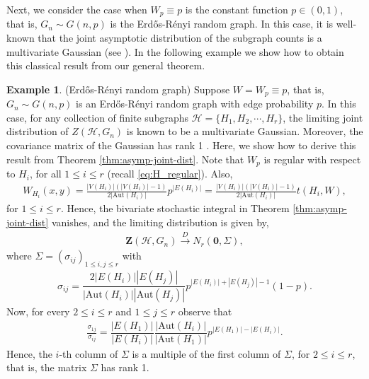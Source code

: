 \documentclass[11pt,reqno]{amsart}
\numberwithin{equation}{section}
\newcommand{\cH}{{\mathcal H}}
\newcommand\Aut{\mathrm{Aut}}
\newcommand\dto{\overset{D}{\rightarrow}}
\theoremstyle{definition}
\newtheorem{example}{Example}[section]
\begin{document}
Next, we consider the case when $W_p \equiv p$ is the constant function $p \in (0, 1)$, that is, $G_n \sim G(n, p)$ is the Erd\H{o}s-R\'enyi random graph. In this case, it is well-known that the joint asymptotic distribution of the subgraph counts is a multivariate Gaussian (see \cite[Section 9]{janson1991asymptotic}). In the following example we show how to obtain this classical result from our general theorem. 



\begin{example}\label{example:randomgraph}(Erd\H{o}s-R\'enyi random graph) 
Suppose $W = W_p \equiv p$, that is, $G_n \sim G(n, p)$ is an Erd\H{o}s-R\'enyi random graph with edge probability $p$. In this case, for any  collection of finite subgraphs $\mathcal{H} = \{H_{1},H_{2}, \cdots, H_{r}\}$, the limiting joint distribution of $Z(\cH, G_n)$ is known to be a multivariate Gaussian. Moreover, the covariance matrix of the Gaussian has rank 1 \cite[Section 9]{janson1991asymptotic}. Here, we show how to derive this result from Theorem \ref{thm:asymp-joint-dist}. Note that $W_p$ is regular with respect to $H_i$, for all $1\leq i\leq r$ (recall \eqref{eq:H_regular}). Also, 
\begin{align*}
    W_{H_{i}}(x,y) = \frac{|V(H_{i})|(|V(H_{i})| - 1)}{2|\Aut{(H_{i})}|}p^{|E(H_{i})|} =\frac{|V(H_{i})|(|V(H_{i})| - 1)}{2|\Aut{(H_{i})}|} t(H_{i},W) , 
\end{align*}
for $1\leq i\leq r$. Hence, the bivariate stochastic integral in Theorem \ref{thm:asymp-joint-dist} vanishes, and the limiting distribution is given by,
\begin{align}\label{eq:ErdosRenyidistconvg}
    \bm{Z}(\mathcal{H}, G_n) \dto N_r(\bm 0, \Sigma) , 
\end{align}
where $\Sigma = (\sigma_{ij})_{1\leq i,j\leq r}$ with 
\begin{align}\label{eq:ErdosRenyicovmat}
    \sigma_{ij} = \dfrac{2 |E(H_{i})||E(H_{j})|}{|\Aut{(H_{i})}||\Aut{(H_{j})}|}p^{|E(H_{i})| + |E(H_{j})| - 1}(1-p).
\end{align} 
Now, for every $2 \leq i \leq r$ and $1 \leq j \leq r$ observe that 
\begin{align*}
    \frac{\sigma_{1j}}{\sigma_{ij}} = \dfrac{|E(H_{1})|}{|E(H_{i})|}\dfrac{|\Aut(H_{i})|}{|\Aut{(H_{1})}|}p^{|E(H_{1})| - |E(H_{i})|} .
\end{align*}
Hence, the $i$-th column of $\Sigma$ is a multiple of the first column of $\Sigma$, for $2 \leq i \leq r$, that is, the matrix $\Sigma$ has rank 1. 

\end{example}
\end{document}

